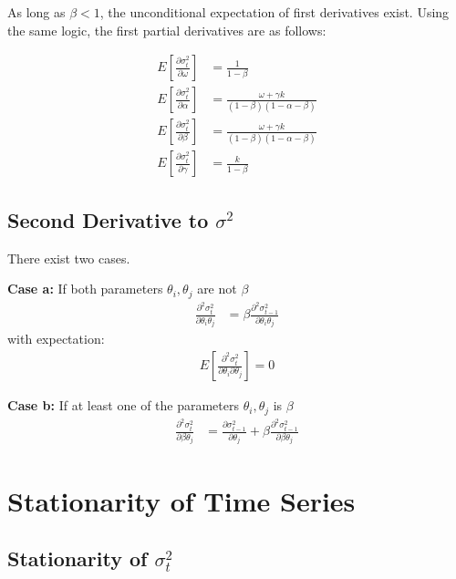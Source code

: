 \documentclass{article}
\begin{document}
As long as $\beta < 1$, the unconditional expectation of first derivatives exist. Using the same logic, the first partial derivatives are as follows:

\begin{align}
    E\left[\frac{\partial \sigma_{t}^2}{\partial \omega}\right] &= \frac{1}{1-\beta} \\
    E\left[\frac{\partial \sigma_{t}^2}{\partial \alpha}\right] &= \frac{\omega + \gamma k}{(1-\beta)(1-\alpha-\beta)} \\
    E\left[\frac{\partial \sigma_{t}^2}{\partial \beta}\right] &= \frac{\omega + \gamma k}{(1-\beta)(1-\alpha-\beta)} \\
    E\left[\frac{\partial \sigma_{t}^2}{\partial \gamma}\right] &= \frac{k}{1-\beta}
\end{align}

\subsection{Second Derivative to $\sigma^2$}
There exist two cases. 

\textbf{Case a:} If both parameters $\theta_i, \theta_j$ are not $\beta$
\begin{align}
    \frac{\partial^2 \sigma_{t}^2}{\partial \theta_i \theta_j} &= \beta \frac{\partial^2 \sigma_{t-1}^2}{\partial \theta_i \theta_j}
\end{align}
with expectation:
\begin{align}
    E\left[\frac{\partial^2 \sigma_{t}^2}{\partial\theta_i \partial\theta_j}\right] = 0
\end{align}

\textbf{Case b:} If at least one of the parameters $\theta_i, \theta_j$ is $\beta$
\begin{align}
    \frac{\partial^2 \sigma_{t}^2}{\partial \beta \theta_j} &= \frac{\partial \sigma_{t-1}^2}{\partial \theta_j } + \beta \frac{\partial^2 \sigma_{t-1}^2}{\partial \beta \theta_j}
\end{align}


\section{Stationarity of Time Series}

\subsection{Stationarity of $\sigma_t^2$}
\end{document}
